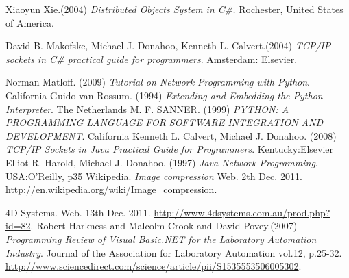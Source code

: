 \begin{thebibliography}{9}
	 Xiaoyun Xie.(2004) \textit{Distributed Objects System in C\#.} Rochester, United States of America. 

	 David B. Makofske, Michael J. Donahoo, Kenneth L. Calvert.(2004) \textit{TCP/IP sockets in C\#  practical guide for programmers}. Amsterdam: Elsevier.

	 Norman Matloff. (2009) \textit{Tutorial on Network Programming with Python}. California
	 Guido van Rossum. (1994) \textit{Extending and Embedding the Python Interpreter}. The Netherlands
	 M. F. SANNER. (1999) \textit{PYTHON: A PROGRAMMING LANGUAGE FOR SOFTWARE
INTEGRATION AND DEVELOPMENT}. California
	 Kenneth L. Calvert, Michael J. Donahoo. (2008) \textit{TCP/IP Sockets in Java
Practical Guide for Programmers}. Kentucky:Elsevier
	 Elliot R. Harold, Michael J. Donahoo. (1997) \textit{Java Network Programming}. USA:O'Reilly, p35
	 Wikipedia. \emph{Image compression} Web. 2th Dec. 2011. \url{http://en.wikipedia.org/wiki/Image_compression}.

	 4D Systems. Web. 13th Dec. 2011. \url{http://www.4dsystems.com.au/prod.php?id=82}.
	Robert Harkness and Malcolm Crook and David Povey.(2007) \textit{Programming Review of Visual Basic.NET for the Laboratory Automation Industry}. Journal of the Association for Laboratory Automation vol.12, p.25-32.
	\url{http://www.sciencedirect.com/science/article/pii/S1535553506005302}.
	
	
\end{thebibliography} 
